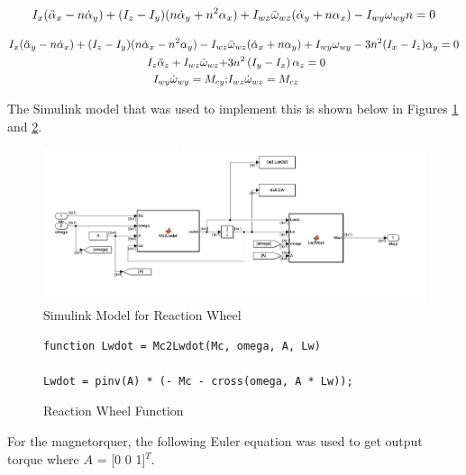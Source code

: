 \begin{align}
    I_x (\Ddot{\alpha}_x - n \dot \alpha_y ) + (I_z - I_y) ( n \dot \alpha_y + n^2 \alpha_x ) + I_{wz}\Bar{\omega}_{wz} ( \dot \alpha_y + n \alpha_x) - I_{wy} \omega_{wy} n = 0
\end{align}

\begin{align*}
    I_x (\Ddot{\alpha}_y - n \dot \alpha_x ) + (I_z - I_y) ( n \dot \alpha_x - n^2 \alpha_y ) - I_{wz}&\Bar{\omega}_{wz} ( \dot \alpha_x + n \alpha_y) + I_{wy} \omega_{wy} - 3 n^2 (I_x - I_z) \alpha_y = 0 \\
    I_z \Ddot{\alpha}_z + I_{wz} \dot \omega_{wz} +& 3n^2\left( I_y - I_x \right) \alpha_z = 0 \\
    I_{wy} \dot \omega_{wy} = M_{cy} ;& I_{wz} \dot \omega_{wz} = M_{cz}
\end{align*}


The Simulink model that was used to implement this is shown below in Figures \ref{fig:simulink_mw} and \ref{fig:rwCode}.

\begin{figure}[H]
    \centering
    \captionsetup{ justification = centering }
    \includegraphics[width = 15cm]{Images/PS9/momentumWheelModel.png}
    \caption{Simulink Model for Reaction Wheel}
    \label{fig:simulink_mw}
\end{figure}

\begin{figure}[H]
    \centering
    \captionsetup{ justification = centering}
    \begin{lstlisting}
function Lwdot = Mc2Lwdot(Mc, omega, A, Lw)

Lwdot = pinv(A) * (- Mc - cross(omega, A * Lw));
    \end{lstlisting}
    \caption{Reaction Wheel Function}
    \label{fig:rwCode}
\end{figure}

For the magnetorquer, the following Euler equation was used to get output torque where $A$ = [0 0 1]$^T$.

